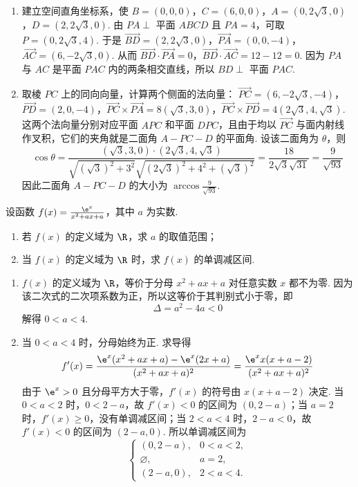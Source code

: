 \begin{solution}
\begin{enumerate}
\item 建立空间直角坐标系，使 \(B=(0,0,0)\)，\(C=(6,0,0)\)，\(A=(0,2\sqrt{3},0)\)，\(D=(2,2\sqrt{3},0)\). 由 \(PA\perp\) 平面 \(ABCD\) 且 \(PA=4\)，可取 \(P=(0,2\sqrt{3},4)\). 于是
\(\overrightarrow{BD}=(2,2\sqrt{3},0)\)，\(\overrightarrow{PA}=(0,0,-4)\)，\(\overrightarrow{AC}=(6,-2\sqrt{3},0)\).
从而 \(\overrightarrow{BD}\cdot\overrightarrow{PA}=0\)，\(\overrightarrow{BD}\cdot\overrightarrow{AC}=12-12=0\). 因为 \(PA\) 与 \(AC\) 是平面 \(PAC\) 内的两条相交直线，所以 \(BD\perp\) 平面 \(PAC\).
\item 取棱 \(PC\) 上的同向向量，计算两个侧面的法向量：
\(\overrightarrow{PC}=(6,-2\sqrt{3},-4)\)，\(\overrightarrow{PD}=(2,0,-4)\)，\(\overrightarrow{PC}\times\overrightarrow{PA}=8(\sqrt{3},3,0)\)，\(\overrightarrow{PC}\times\overrightarrow{PD}=4(2\sqrt{3},4,\sqrt{3})\).
这两个法向量分别对应平面 \(APC\) 和平面 \(DPC\)，且由于均以 \(\overrightarrow{PC}\) 与面内射线作叉积，它们的夹角就是二面角 \(A-PC-D\) 的平面角. 设该二面角为 \(\theta\)，则
\[
\cos\theta=\frac{(\sqrt{3},3,0)\cdot(2\sqrt{3},4,\sqrt{3})}{\sqrt{(\sqrt{3})^2+3^2}\sqrt{(2\sqrt{3})^2+4^2+(\sqrt{3})^2}}
=\frac{18}{2\sqrt{3}\sqrt{31}}=\frac{9}{\sqrt{93}}
\]
因此二面角 \(A-PC-D\) 的大小为 \(\arccos\frac{9}{\sqrt{93}}\).
\end{enumerate}
\end{solution}

\begin{problem}
设函数 \( f(x) = \frac{\e^x}{x^2 + a x + a} \)，其中 \( a \) 为实数.
\begin{enumerate}
\item 若 \( f(x) \) 的定义域为 \(\R\)，求 \(a\) 的取值范围；
\item 当 \( f(x) \) 的定义域为 \(\R\) 时，求 \( f(x) \) 的单调减区间.
\end{enumerate}
\end{problem}

\begin{solution}
\begin{enumerate}
\item \(f(x)\) 的定义域为 \(\R\)，等价于分母 \(x^2+ax+a\) 对任意实数 \(x\) 都不为零. 因为该二次式的二次项系数为正，所以这等价于其判别式小于零，即
\[
\Delta=a^2-4a<0
\]
解得 \(0<a<4\).
\item 当 \(0<a<4\) 时，分母始终为正. 求导得
\[
f'(x)=\frac{\e^x(x^2+ax+a)-\e^x(2x+a)}{(x^2+ax+a)^2}
=\frac{\e^x x(x+a-2)}{(x^2+ax+a)^2}
\]
由于 \(\e^x>0\) 且分母平方大于零，\(f'(x)\) 的符号由 \(x(x+a-2)\) 决定. 当 \(0<a<2\) 时，\(0<2-a\)，故 \(f'(x)<0\) 的区间为 \((0,2-a)\)；当 \(a=2\) 时，\(f'(x)\geqslant0\)，没有单调减区间；当 \(2<a<4\) 时，\(2-a<0\)，故 \(f'(x)<0\) 的区间为 \((2-a,0)\). 所以单调减区间为
\[
\begin{cases}
(0,2-a),&0<a<2,\\
\varnothing,&a=2,\\
(2-a,0),&2<a<4.
\end{cases}
\]
\end{enumerate}
\end{solution}

